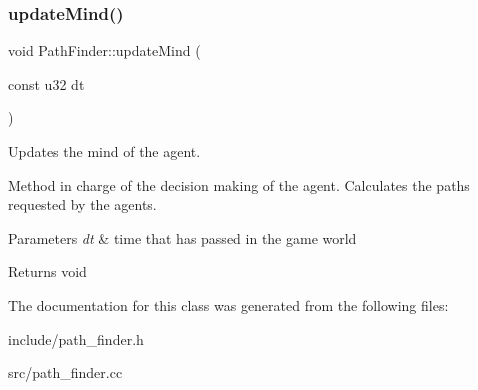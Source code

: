 \subsubsection{\texorpdfstring{update\+Mind()}{updateMind()}}
{\footnotesize\ttfamily void Path\+Finder\+::update\+Mind (\begin{DoxyParamCaption}\item[{const u32}]{dt }\end{DoxyParamCaption})}



Updates the mind of the agent. 

Method in charge of the decision making of the agent. Calculates the paths requested by the agents.


\begin{DoxyParams}{Parameters}
{\em dt} & time that has passed in the game world \\
\hline
\end{DoxyParams}
\begin{DoxyReturn}{Returns}
void 
\end{DoxyReturn}


The documentation for this class was generated from the following files\+:\begin{DoxyCompactItemize}
\item 
include/path\+\_\+finder.\+h\item 
src/path\+\_\+finder.\+cc\end{DoxyCompactItemize}
